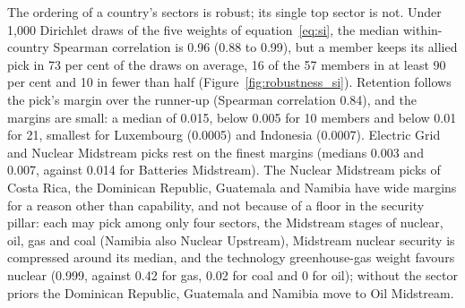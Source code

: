 The ordering of a country's sectors is robust; its single top sector is not. Under 1{,}000 Dirichlet
draws of the five weights of equation~\eqref{eq:si}, the median within-country Spearman correlation
is 0.96 (0.88 to 0.99), but a member keeps its allied pick in 73 per cent of the draws on average,
16 of the 57 members in at least 90 per cent and 10 in fewer than half
(Figure~\ref{fig:robustness_si}). Retention follows the pick's margin over the runner-up (Spearman
correlation 0.84), and the margins are small: a median of 0.015, below 0.005 for 10 members and
below 0.01 for 21, smallest for Luxembourg (0.0005) and Indonesia (0.0007). Electric Grid and Nuclear
Midstream picks rest on the finest margins (medians 0.003 and 0.007, against 0.014 for Batteries
Midstream). The Nuclear Midstream picks of Costa Rica, the Dominican Republic, Guatemala and Namibia
have wide margins for a reason other than capability, and not because of a floor in the security
pillar: each may pick among only four sectors, the Midstream stages of nuclear, oil, gas and coal
(Namibia also Nuclear Upstream), Midstream nuclear security is compressed around its median, and the
technology greenhouse-gas weight favours nuclear (0.999, against 0.42 for gas, 0.02 for coal and 0
for oil); without the sector priors the Dominican Republic, Guatemala and Namibia move to Oil
Midstream.

